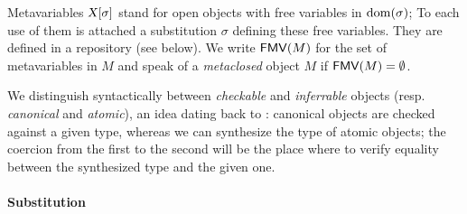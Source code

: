 \documentclass[9pt]{sigplanconf}
\begin{document}
Metavariables ${\text{\textsl{X}}}[{\sigma}]$ stand for open objects with free
variables in $\operatorname{dom}{\!(\sigma)}$; To each use of them is attached a
substitution $\sigma$ defining these free variables. They are defined
in a repository (see below). We write ${\text{\textsf{FMV}}}({M})$ for the set of
metavariables in $M$ and speak of a \emph{metaclosed} object $M$ if
${\text{\textsf{FMV}}}({M}) = \emptyset$.

We distinguish syntactically between \emph{checkable} and
\emph{inferrable} objects (resp. \emph{canonical} and \emph{atomic}),
an idea dating back to \cite{pierce2000local}: canonical objects are
checked against a given type, whereas we can synthesize the type of
atomic objects; the coercion from the first to the second will be the
place where to verify equality between the synthesized type and the
given one.

\paragraph{Substitution}
\end{document}

